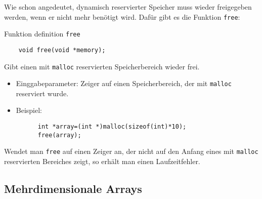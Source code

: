Wie schon angedeutet, dynamisch reservierter Speicher muss wieder freigegeben werden, wenn er nicht mehr benötigt wird.
Dafür gibt es die Funktion \verb|free|:
\begin{myexampleblock}{Funktion definition \texttt{free}}
  \begin{lstlisting}
    void free(void *memory);
  \end{lstlisting}
  \vspace{-0.7cm}
  Gibt einen mit \verb|malloc| reservierten Speicherbereich wieder frei.
  \begin{itemize}
  \item Einggabeparameter: Zeiger auf einen Speicherbereich, der mit \verb|malloc| reserviert wurde.
  \item Beispiel:
    \begin{lstlisting}
      int *array=(int *)malloc(sizeof(int)*10);
      free(array);
    \end{lstlisting}
  \end{itemize}
  \vspace{-0.7cm}
\end{myexampleblock}
Wendet man \verb|free| auf einen Zeiger an, der nicht auf den Anfang eines mit \verb|malloc| reservierten Bereiches zeigt, so erhält man einen Laufzeitfehler.

\subsection{Mehrdimensionale Arrays}

